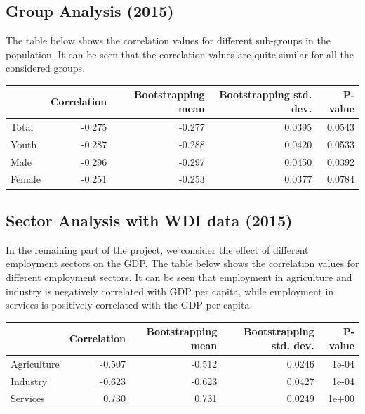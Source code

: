 \documentclass[
]{article}
\begin{document}
\hypertarget{group-analysis-2015}{%
\subsection{Group Analysis (2015)}\label{group-analysis-2015}}

The table below shows the correlation values for different sub-groups in
the population. It can be seen that the correlation values are quite
similar for all the considered groups.

\begin{table}
\centering
\begin{tabular}{l|r|r|r|r}
\hline
  & Correlation & Bootstrapping mean & Bootstrapping std. dev. & P-value\\
\hline
Total & -0.275 & -0.277 & 0.0395 & 0.0543\\
\hline
Youth & -0.287 & -0.288 & 0.0420 & 0.0533\\
\hline
Male & -0.296 & -0.297 & 0.0450 & 0.0392\\
\hline
Female & -0.251 & -0.253 & 0.0377 & 0.0784\\
\hline
\end{tabular}
\end{table}

\hypertarget{sector-analysis-with-wdi-data-2015}{%
\subsection{Sector Analysis with WDI data
(2015)}\label{sector-analysis-with-wdi-data-2015}}

In the remaining part of the project, we consider the effect of
different employment sectors on the GDP. The table below shows the
correlation values for different employment sectors. It can be seen that
employment in agriculture and industry is negatively correlated with GDP
per capita, while employment in services is positively correlated with
the GDP per capita.

\begin{table}
\centering
\begin{tabular}{l|r|r|r|r}
\hline
  & Correlation & Bootstrapping mean & Bootstrapping std. dev. & P-value\\
\hline
Agriculture & -0.507 & -0.512 & 0.0246 & 1e-04\\
\hline
Industry & -0.623 & -0.623 & 0.0427 & 1e-04\\
\hline
Services & 0.730 & 0.731 & 0.0249 & 1e+00\\
\hline
\end{tabular}
\end{table}
\end{document}
